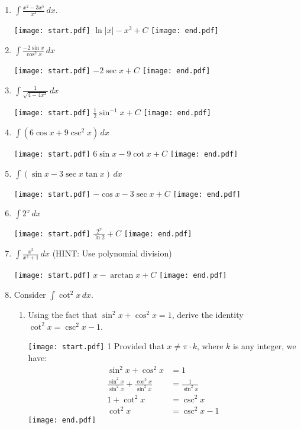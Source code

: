 \documentclass[12pt]{article}
\begin{document}
\begin{enumerate}
\item $\int \frac{x^2-3x^5}{x^3} \,dx$.

\texttt{[image: start.pdf]}
{{$\ln{|x|}-x^3+C$}}
\texttt{[image: end.pdf]}


\item $\int \frac{-2\sin{x}}{\cos^{2}x} \,dx$ 

\texttt{[image: start.pdf]}
{{$-2\sec{x}+C$}}
\texttt{[image: end.pdf]}


\item $\int \frac{1}{\sqrt{4-4x^2}} \,dx$ 

\texttt{[image: start.pdf]}
{{$\frac{1}{2}\sin^{-1}{x}+C$}}
\texttt{[image: end.pdf]}


\item $\int \left(6\cos{x}+9\csc^{2}{x}\right) \,dx$ 

\texttt{[image: start.pdf]}
{{$6\sin{x}-9\cot{x}+C$}}
\texttt{[image: end.pdf]}


\item $\int \left(\sin{x}-3\sec{x}\tan{x}\right) \,dx$ 

\texttt{[image: start.pdf]}
{{$-\cos{x}-3\sec{x}+C$}}
\texttt{[image: end.pdf]}


\item $\int 2^{x} \,dx$ 

\texttt{[image: start.pdf]}
{{$\frac{2^{x}}{\ln{2}}+C$}}
\texttt{[image: end.pdf]}


\item $\int \frac{x^2}{x^2+1} \,dx$ (HINT: Use polynomial division)

\texttt{[image: start.pdf]}
{{$x-\arctan{x}+C$}}
\texttt{[image: end.pdf]}


\item Consider $\int{\cot^{2}{x}} \,dx$.

\begin{enumerate}

\item Using the fact that $\sin^{2}{x}+\cos^{2}{x}=1$, derive the identity $\cot^2{x}=\csc^{2}{x}-1$.

\texttt{[image: start.pdf]}
{{{1\linewidth}{ Provided that $x \neq \pi \cdot k$, where $k$ is any integer, we have:
\begin{align*} 
\sin^{2}{x}+\cos^{2}{x} &=1\\
\frac{\sin^{2}{x}}{\sin^{2}{x}}+\frac{\cos^{2}{x}}{\sin^2{x}}&=\frac{1}{\sin^2{x}}\\
1+\cot^2{x}&=\csc^2{x}\\
\cot^2{x}&=\csc^2{x}-1
\end{align*}
}}}
\texttt{[image: end.pdf]}



\end{enumerate}
\end{enumerate}
\end{document}
